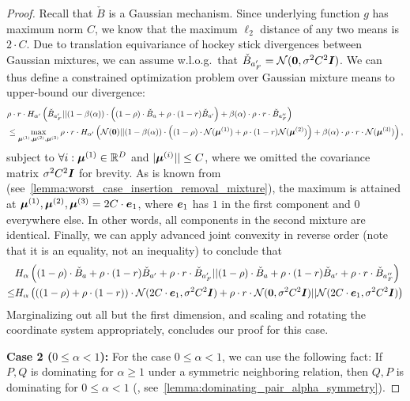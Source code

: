 \begin{proof}
    Recall that $\check{B}$ is a Gaussian mechanism.
    Since underlying function $g$ has maximum norm $C$, we know that the maximum $\ell_2$ distance of any two means is $2 \cdot C$.
    Due to translation equivariance of hockey stick divergences between Gaussian mixtures, we can
    assume w.l.o.g.\ that $\check{B}_{a'_F} = \mathcal{N}({\bm{0}}, \sigma^2 C^2 {\bm{I}})$.
    We can thus define a constrained optimization problem over Gaussian mixture means to upper-bound our divergence:
    \begin{align*}
        &
        \rho \cdot r \cdot
        H_{\alpha'} \left(
             \check{B}_{a'_F}
            ||
            (1 - \beta(\alpha)) \cdot \left((1 - \rho) \cdot \check{B}_{a} + \rho \cdot (1-r) \check{B}_{a'} \right)+
            \beta(\alpha) \cdot \rho \cdot r \cdot  \check{B}_{a''_F}
        \right)
        \\
        &
        \leq
        \max_{{\bm{\mu}}^{(1)}, {\bm{\mu}}^{(2)}, {\bm{\mu}}^{(3)}}
        \rho \cdot r \cdot
        H_{\alpha'} \left(
             \mathcal{N}({\bm{0}})
            ||
            (1 - \beta(\alpha)) \cdot \left((1 - \rho) \cdot \mathcal{N}({\bm{\mu}}^{(1)}) + \rho \cdot (1-r) \mathcal{N}({\bm{\mu}}^{(2)}) \right)+
            \beta(\alpha) \cdot \rho \cdot r \cdot  \mathcal{N}({\bm{\mu}}^{(3)})
        \right),
    \end{align*}
    subject to $\forall i: {\bm{\mu}}^{(1)} \in {\mathbb{R}}^D$ and $|{\bm{\mu}}^{(i)}|| \leq C$, 
    where we omitted the covariance matrix $\sigma^2 C^2 {\bm{I}}$ for brevity.
    As is known from~\cite{schuchardt2024unified} (see~\cref{lemma:worst_case_insertion_removal_mixture}),
    the maximum is attained at ${\bm{\mu}}^{(1)}, {\bm{\mu}}^{(2)}, {\bm{\mu}}^{(3)} = 2  C \cdot {\bm{e}}_1$, where ${\bm{e}}_1$ has $1$ in the first component and $0$ everywhere else.
    In other words, all components in the second mixture are identical.
    Finally, we can apply advanced joint convexity in reverse order (note that it is an equality, not an inequality)
    to conclude that 
    \begin{align*}
        &H_\alpha \left(
            (1 - \rho) \cdot \check{B}_{a} + \rho \cdot (1-r) \check{B}_{a'} + \rho \cdot r  \cdot  \check{B}_{a'_F}
            ||
            (1 - \rho) \cdot \check{B}_{a} + \rho \cdot (1-r) \check{B}_{a'} + \rho \cdot r \cdot  \check{B}_{a''_F}
        \right)
        \\
        \leq 
        &
        H_\alpha \left(
            ((1 - \rho) + \rho \cdot (1-r)) \cdot \mathcal{N}(2 C \cdot {\bm{e}}_1, \sigma^2 C^2 {\bm{I}}) + \rho \cdot r  \cdot  \mathcal{N}({\bm{0}}, \sigma^2 C^2 {\bm{I}})
            ||
            \mathcal{N}(2  C \cdot {\bm{e}}_1, \sigma^2 C^2 {\bm{I}})
        \right)
    \end{align*}
    Marginalizing out all but the first dimension, and scaling and rotating the coordinate system appropriately, concludes our proof for this case.
    
    \textbf{Case 2 ($0 \leq \alpha < 1$):}
    For the case $0 \leq \alpha < 1$, we can use the following fact:
    If $P,Q$ is dominating for $\alpha \geq 1$ under a symmetric neighboring relation,
    then $Q, P$ is dominating for $0 \leq \alpha < 1$ (\citet{zhu2022optimal}, see~\cref{lemma:dominating_pair_alpha_symmetry}).
\end{proof}

